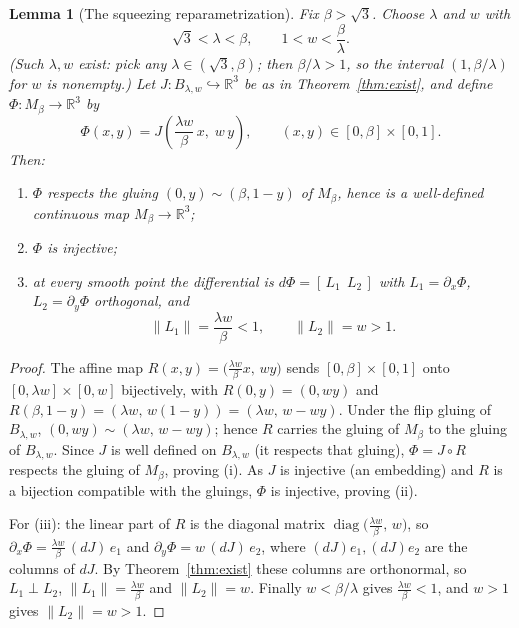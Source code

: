 \documentclass[11pt]{article}
\newtheorem{lemma}{Lemma}
\theoremstyle{definition}
\newcommand{\R}{\mathbb{R}}
\newcommand{\norm}[1]{\lVert #1 \rVert}
\DeclareMathOperator{\diag}{diag}
\begin{document}
\begin{lemma}[The squeezing reparametrization]\label{lem:embedmodel}
Fix $\beta>\sqrt3$. Choose $\lambda$ and $w$ with
\[
\sqrt3<\lambda<\beta,\qquad 1<w<\frac{\beta}{\lambda}.
\]
(Such $\lambda,w$ exist: pick any $\lambda\in(\sqrt3,\beta)$; then $\beta/\lambda>1$, so the
interval $(1,\beta/\lambda)$ for $w$ is nonempty.) Let $J:B_{\lambda,w}\hookrightarrow\R^3$
be as in Theorem~\ref{thm:exist}, and define $\Phi:M_\beta\to\R^3$ by
\begin{equation}\label{eq:Phidef}
\Phi(x,y)=J\!\left(\frac{\lambda w}{\beta}\,x,\; w\,y\right),\qquad (x,y)\in[0,\beta]\times[0,1].
\end{equation}
Then:
\begin{enumerate}
\item[(i)] $\Phi$ respects the gluing $(0,y)\sim(\beta,1-y)$ of $M_\beta$, hence is a
well-defined continuous map $M_\beta\to\R^3$;
\item[(ii)] $\Phi$ is injective;
\item[(iii)] at every smooth point the differential is $d\Phi=[\,L_1\ \ L_2\,]$ with
$L_1=\partial_x\Phi$, $L_2=\partial_y\Phi$ orthogonal, and
\[
\norm{L_1}=\frac{\lambda w}{\beta}<1,\qquad \norm{L_2}=w>1.
\]
\end{enumerate}
\end{lemma}

\begin{proof}
The affine map $R(x,y)=\big(\tfrac{\lambda w}{\beta}x,\,wy\big)$ sends $[0,\beta]\times[0,1]$
onto $[0,\lambda w]\times[0,w]$ bijectively, with $R(0,y)=(0,wy)$ and
$R(\beta,1-y)=(\lambda w,\,w(1-y))=(\lambda w,\,w-wy)$. Under the flip gluing of
$B_{\lambda,w}$, $(0,wy)\sim(\lambda w,\,w-wy)$; hence $R$ carries the gluing of $M_\beta$ to
the gluing of $B_{\lambda,w}$. Since $J$ is well defined on $B_{\lambda,w}$ (it respects that
gluing), $\Phi=J\circ R$ respects the gluing of $M_\beta$, proving (i). As $J$ is injective
(an embedding) and $R$ is a bijection compatible with the gluings, $\Phi$ is injective,
proving (ii).

For (iii): the linear part of $R$ is the diagonal matrix
$\diag\!\big(\tfrac{\lambda w}{\beta},\,w\big)$, so $\partial_x\Phi=\tfrac{\lambda
w}{\beta}\,(dJ)\,e_1$ and $\partial_y\Phi=w\,(dJ)\,e_2$, where $(dJ)e_1,(dJ)e_2$ are the
columns of $dJ$. By Theorem~\ref{thm:exist} these columns are orthonormal, so $L_1\perp L_2$,
$\norm{L_1}=\tfrac{\lambda w}{\beta}$ and $\norm{L_2}=w$. Finally $w<\beta/\lambda$ gives
$\tfrac{\lambda w}{\beta}<1$, and $w>1$ gives $\norm{L_2}=w>1$.
\end{proof}
\end{document}
